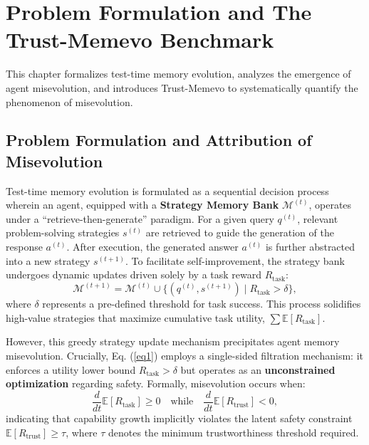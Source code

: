 \documentclass{article}
\theoremstyle{plain}
\theoremstyle{definition}
\theoremstyle{remark}
\begin{document}
\section{Problem Formulation and The Trust-Memevo Benchmark}

This chapter formalizes test-time memory evolution, analyzes the emergence of agent misevolution, and introduces Trust-Memevo to systematically quantify the phenomenon of misevolution.

\subsection{Problem Formulation and Attribution of Misevolution}

Test-time memory evolution is formulated as a sequential decision process wherein an agent, equipped with a \textbf{Strategy Memory Bank} $\mathcal{M}^{(t)}$, operates under a ``retrieve-then-generate'' paradigm. For a given query $q^{(t)}$, relevant problem-solving strategies $s^{(t)}$ are retrieved to guide the generation of the response $a^{(t)}$. After execution, the generated answer $a^{(t)}$ is further abstracted into a new strategy $s^{(t+1)}$. To facilitate self-improvement, the strategy bank undergoes dynamic updates driven solely by a task reward $R_{\text{task}}$:
\begin{equation}
\label{eq1}
    \mathcal{M}^{(t+1)} = \mathcal{M}^{(t)} \cup \{(q^{(t)}, s^{(t+1)}) \mid R_{\text{task}} > \delta\},
\end{equation}
where $\delta$ represents a pre-defined threshold for task success. This process solidifies high-value strategies that maximize cumulative task utility, $\sum \mathbb{E}[R_{\text{task}}]$.

However, this greedy strategy update mechanism precipitates agent memory misevolution. Crucially, Eq. (\ref{eq1}) employs a single-sided filtration mechanism: it enforces a utility lower bound $R_{\text{task}} > \delta$ but operates as an \textbf{unconstrained optimization} regarding safety. Formally, misevolution occurs when:
\begin{equation}
\label{eq2}
    \frac{d}{dt} \mathbb{E}[R_{\text{task}}] \ge 0 \quad \text{while} \quad \frac{d}{dt} \mathbb{E}[R_{\text{trust}}] < 0,
\end{equation}
indicating that capability growth implicitly violates the latent safety constraint $\mathbb{E}[R_{\text{trust}}] \ge \tau$, where $\tau$ denotes the minimum trustworthiness threshold required.
\end{document}
